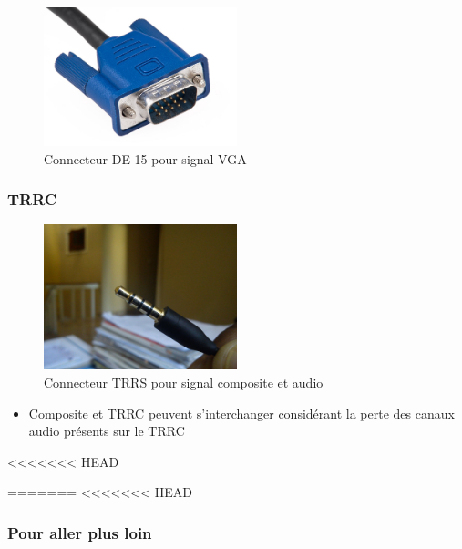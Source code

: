 \documentclass[
  french,
]{book}
\providecommand{\tightlist}{%
  \setlength{\itemsep}{0pt}\setlength{\parskip}{0pt}}
\begin{document}
\begin{figure}
\centering
\includegraphics[width=0.5\textwidth,height=\textheight]{medias/lexique/signaux/analogue/vga.jpg}
\caption{Connecteur DE-15 pour signal VGA}
\end{figure}

\hypertarget{trrc}{%
\subsubsection{TRRC}\label{trrc}}

\begin{figure}
\centering
\includegraphics[width=0.5\textwidth,height=\textheight]{medias/lexique/signaux/analogue/3_5mm.jpg}
\caption{Connecteur TRRS pour signal composite et audio}
\end{figure}

\begin{itemize}
\tightlist
\item
  Composite et TRRC peuvent s'interchanger considérant la perte des canaux audio présents sur le TRRC
\end{itemize}

\textless\textless\textless\textless\textless\textless\textless{} HEAD

=======
\textless\textless\textless\textless\textless\textless\textless{} HEAD

\hypertarget{pour-aller-plus-loin}{%
\subsubsection{Pour aller plus loin}\label{pour-aller-plus-loin}}
\end{document}
